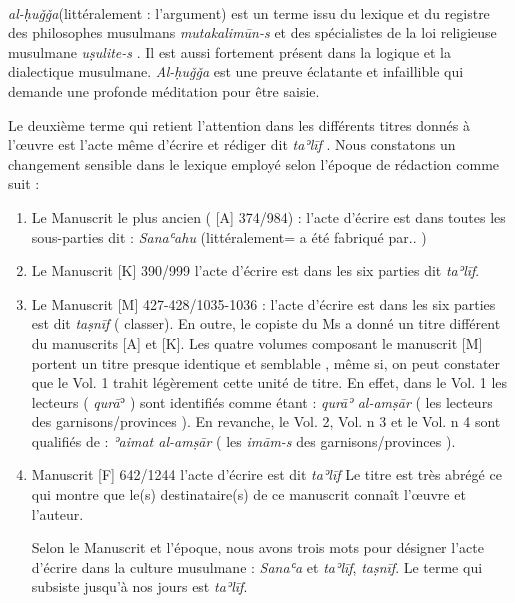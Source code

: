 \documentclass[a4paper,12pt]{report}
\begin{document}
\begin{itemize}
\begin{enumerate}
 
\paragraph{}
\textit{al-ḥuǧǧa}(littéralement : l’argument) est un terme issu du lexique et du registre  des  philosophes musulmans  \textit{mutakalimūn-s} et des spécialistes de la loi religieuse musulmane \textit{uṣulite-s }. Il est aussi fortement présent dans   la logique et la dialectique musulmane. \textit{Al-ḥuǧǧa } est une  preuve éclatante et infaillible qui demande une profonde méditation pour être saisie.

Le deuxième terme qui retient l'attention dans les différents titres donnés à l'œuvre est  l'acte même d'écrire et rédiger dit 	\textit{taʾlīf} . Nous constatons un changement sensible dans le lexique employé  selon l'époque de rédaction comme suit :

 \begin{enumerate}
     \item Le Manuscrit le plus ancien ( [A] 374/984) : l'acte d'écrire est dans toutes les sous-parties   dit :	\textit{Sanaʿahu} (littéralement= a été fabriqué  par.. ) 
  \item  Le Manuscrit  [K] 390/999 l'acte d'écrire est dans les six parties  dit	\textit{taʾlīf}.  
    
    \item Le Manuscrit [M] 427-428/1035-1036 : l'acte d'écrire est dans les six parties est dit \textit{taṣnīf} ( classer). En outre,  le copiste du Ms a donné un titre différent du manuscrits [A] et [K].  Les quatre volumes composant le manuscrit [M] portent un titre presque identique et semblable , même si,   on peut constater   que le Vol.  1 trahit légèrement cette unité de titre. En effet, dans le Vol. 1 les lecteurs ( \textit{qurā}ʾ ) sont identifiés comme étant : \textit{qurāʾ al-amṣār} ( les lecteurs des garnisons/provinces ). En revanche, le Vol.  2, Vol. n 3 et le Vol. n 4  sont qualifiés de :\textit{ ʾaimat al-amṣār} ( les \textit{im\=am-s} des garnisons/provinces ). 


     \item Manuscrit [F] 642/1244 l'acte d'écrire est dit	\textit{taʾlīf} Le titre est très abrégé ce qui montre que le(s) destinataire(s) de ce manuscrit connaît l'œuvre et l'auteur.

     Selon le Manuscrit et l'époque, nous avons trois mots pour désigner l'acte d'écrire dans la culture musulmane : \textit{Sanaʿa} et \textit{taʾlīf}, \textit{taṣnīf}.  Le  terme qui subsiste jusqu'à nos jours est \textit{taʾlīf}.  
 \end{enumerate}


\end{enumerate}
\end{itemize}
\end{document}
